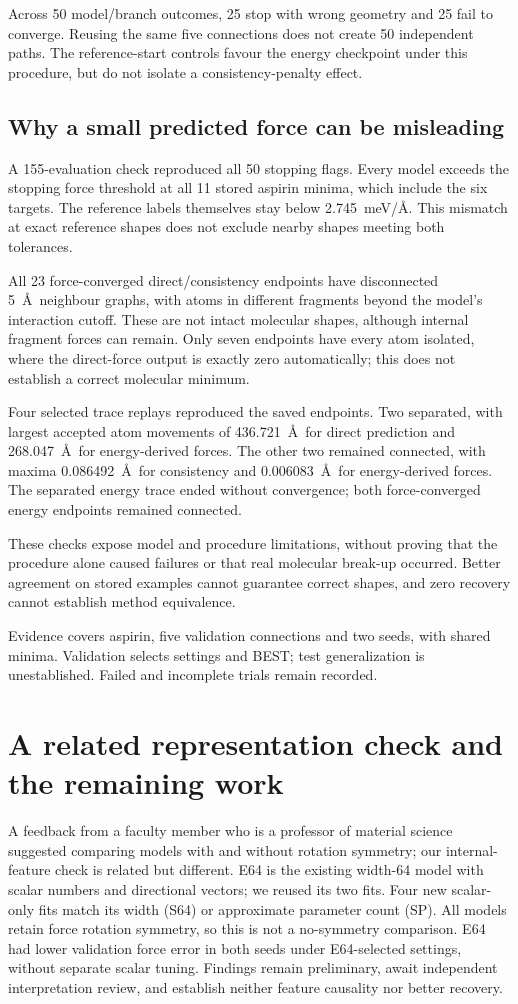 \documentclass{article}
\begin{document}
Across 50 model/branch outcomes, 25 stop with wrong geometry and 25 fail to converge. Reusing the same five connections does not create 50 independent paths. The reference-start controls favour the energy checkpoint under this procedure, but do not isolate a consistency-penalty effect.
\subsection{Why a small predicted force can be misleading}
A 155-evaluation check reproduced all 50 stopping flags. Every model exceeds the stopping force threshold at all 11 stored aspirin minima, which include the six targets. The reference labels themselves stay below 2.745~meV/\AA. This mismatch at exact reference shapes does not exclude nearby shapes meeting both tolerances.

All 23 force-converged direct/consistency endpoints have disconnected 5~\AA\ neighbour graphs, with atoms in different fragments beyond the model's interaction cutoff. These are not intact molecular shapes, although internal fragment forces can remain. Only seven endpoints have every atom isolated, where the direct-force output is exactly zero automatically; this does not establish a correct molecular minimum.

Four selected trace replays reproduced the saved endpoints. Two separated, with largest accepted atom movements of 436.721~\AA\ for direct prediction and 268.047~\AA\ for energy-derived forces. The other two remained connected, with maxima 0.086492~\AA\ for consistency and 0.006083~\AA\ for energy-derived forces. The separated energy trace ended without convergence; both force-converged energy endpoints remained connected.

These checks expose model and procedure limitations, without proving that the procedure alone caused failures or that real molecular break-up occurred. Better agreement on stored examples cannot guarantee correct shapes, and zero recovery cannot establish method equivalence.

Evidence covers aspirin, five validation connections and two seeds, with shared minima. Validation selects settings and BEST; test generalization is unestablished. Failed and incomplete trials remain recorded.

\section{A related representation check and the remaining work}
A feedback from a faculty member who is a professor of material science suggested comparing models with and without rotation symmetry; our internal-feature check is related but different. E64 is the existing width-64 model with scalar numbers and directional vectors; we reused its two fits. Four new scalar-only fits match its width (S64) or approximate parameter count (SP). All models retain force rotation symmetry, so this is not a no-symmetry comparison. E64 had lower validation force error in both seeds under E64-selected settings, without separate scalar tuning. Findings remain preliminary, await independent interpretation review, and establish neither feature causality nor better recovery.
\end{document}
